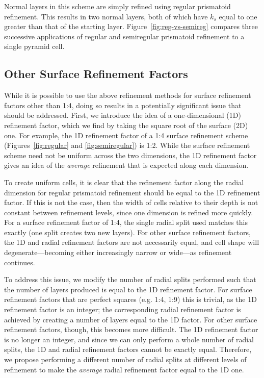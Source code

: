 Normal layers in this scheme are simply refined using regular prismatoid refinement.
This results in two normal layers, both of which have $k_s$ equal to one greater than that of the starting layer.
Figure~\ref{fig:reg-vs-semireg} compares three successive applications of regular and semiregular prismatoid refinement to a single pyramid cell.


\subsection{Other Surface Refinement Factors} \label{chap:5:factors}
While it is possible to use the above refinement methods for surface refinement factors other than 1:4, doing so results in a potentially significant issue that should be addressed.
First, we introduce the idea of a one-dimensional (1D) refinement factor, which we find by taking the square root of the surface (2D) one.
For example, the 1D refinement factor of a 1:4 surface refinement scheme (Figures~\ref{fig:regular} and \ref{fig:semiregular}) is 1:2.
While the surface refinement scheme need not be uniform across the two dimensions, the 1D refinement factor gives an idea of the \textit{average} refinement that is expected along each dimension.


To create uniform cells, it is clear that the refinement factor along the radial dimension for regular prismatoid refinement should be equal to the 1D refinement factor.
If this is not the case, then the width of cells relative to their depth is not constant between refinement levels, since one dimension is refined more quickly.
For a surface refinement factor of 1:4, the single radial split used matches this exactly (one split creates two new layers).
For other surface refinement factors, the 1D and radial refinement factors are not necessarily equal, and cell shape will degenerate---becoming either increasingly narrow or wide---as refinement continues.


To address this issue, we modify the number of radial splits performed such that the number of layers produced is equal to the 1D refinement factor.
For surface refinement factors that are perfect squares (e.g.
1:4, 1:9) this is trivial, as the 1D refinement factor is an integer; the corresponding radial refinement factor is achieved by creating a number of layers equal to the 1D factor.
For other surface refinement factors, though, this becomes more difficult.
The 1D refinement factor is no longer an integer, and since we can only perform a whole number of radial splits, the 1D and radial refinement factors cannot be exactly equal.
Therefore, we propose performing a different number of radial splits at different levels of refinement to make the \textit{average} radial refinement factor equal to the 1D one.


